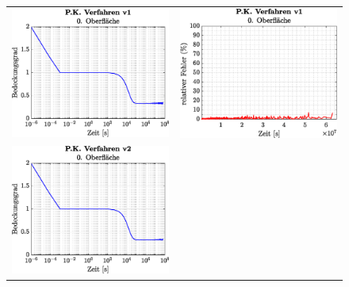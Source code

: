 \documentclass{listhesis}
\begin{document}
\begin{figure}[!h]
\begin{tabular}{@{}cc@{}}
\includegraphics[width=\ws\textwidth]{./include/figure_2.0/PC_current/CovFacet0.eps}&
\includegraphics[width=\ws\textwidth]{./include/figure_2.0/PC_current/CovFacetError0.eps}\\
\includegraphics[width=\ws\textwidth]{./include/figure_2.0/PC_new/CovFacet0.eps}&

\end{tabular}
\end{figure}
\end{document}
